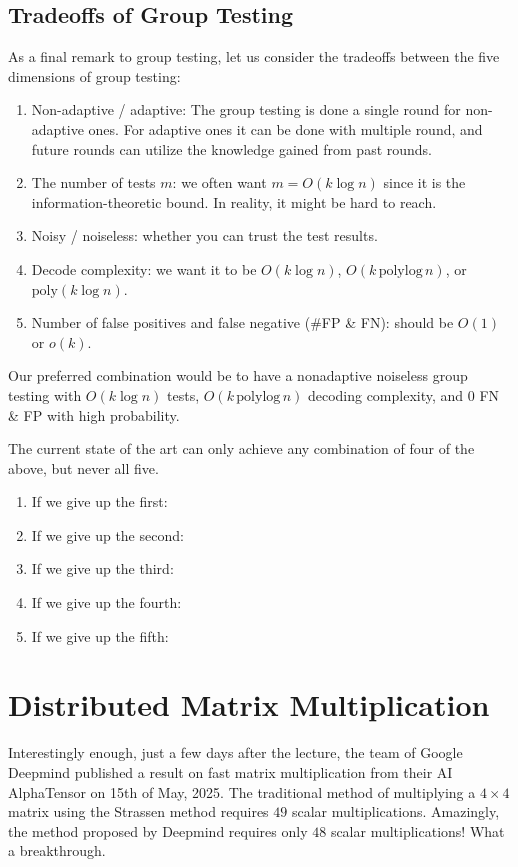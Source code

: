 \subsection{Tradeoffs of Group Testing}

As a final remark to group testing, let us consider the tradeoffs between the five dimensions of group testing:
\begin{enumerate}
    \item Non-adaptive / adaptive: The group testing is done a single round for non-adaptive ones. For adaptive ones it can be done with multiple round, and future rounds can utilize the knowledge gained from past rounds.
    \item The number of tests $m$: we often want $m=O(k\log n)$ since it is the information-theoretic bound. In reality, it might be hard to reach.
    \item Noisy / noiseless: whether you can trust the test results.
    \item Decode complexity: we want it to be $O(k\log n)$, $O(k\,\mathrm{polylog}\,n)$, or $\mathrm{poly}(k\log n)$.
    \item Number of false positives and false negative (\#FP \& FN): should be $O(1)$ or $o(k)$.
\end{enumerate}
Our preferred combination would be to have a nonadaptive noiseless group testing with $O(k\log n)$ tests, $O(k\,\mathrm{polylog}\,n)$ decoding complexity, and 0 FN \& FP with high probability.

The current state of the art can only achieve any combination of four of the above, but never all five.
\begin{enumerate}
    \item If we give up the first:


    \item If we give up the second:


    \item If we give up the third:


    \item If we give up the fourth:


    \item If we give up the fifth:

    
\end{enumerate}

\section{Distributed Matrix Multiplication}

\begin{remark}
    Interestingly enough, just a few days after the lecture, the team of Google Deepmind published a result on fast matrix multiplication from their AI AlphaTensor on 15th of May, 2025. The traditional method of multiplying a $4\times4$ matrix using the Strassen method requires $49$ scalar multiplications. Amazingly, the method proposed by Deepmind requires only $48$ scalar multiplications! What a breakthrough.
\end{remark}